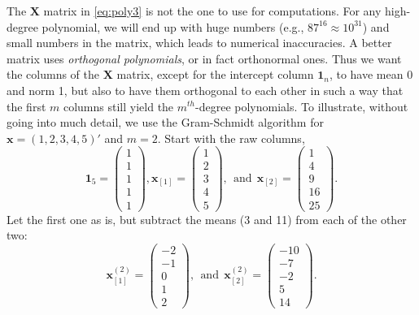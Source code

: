 \documentclass[
]{book}
\begin{document}
The \(\mathbf{X}\) matrix in \eqref{eq:poly3} is not the one to use for computations. For any high-degree polynomial, we will end up with huge numbers (e.g., \(87^{16}\approx 10^{31}\)) and small numbers in the matrix, which leads to numerical inaccuracies. A better matrix uses \emph{orthogonal polynomials}, or in fact orthonormal ones. Thus we want the columns of the \(\mathbf{X}\) matrix, except for the intercept column \(\mathbf{1}_n\), to have mean 0 and norm 1, but also to have them orthogonal to each other in such a way that the first \(m\) columns still yield the \(m^{th}\)-degree polynomials. To illustrate, without going into much detail, we use the Gram-Schmidt algorithm for \(\mathbf{x}=(1,2,3,4,5)'\) and \(m=2\). Start with the raw columns,
\begin{equation}
\mathbf{1}_5=\begin{pmatrix}1\\1\\1\\1\\1\end{pmatrix},
\mathbf{x}_{[1]} = \begin{pmatrix}1\\2\\3\\4\\5\end{pmatrix},~~\text{and}~~
\mathbf{x}_{[2]} = \begin{pmatrix}1\\4\\9\\16\\25\end{pmatrix}.
\label{eq:poly10}
\end{equation}
Let the first one as is, but subtract the means (3 and 11) from each of the other two:
\begin{equation}
{\mathbf{x}}^{(2)}_{[1]} = \begin{pmatrix}-2\\-1\\0\\1\\2\end{pmatrix},~~\text{and}~~
{\mathbf{x}}^{(2)}_{[2]} = \begin{pmatrix}-10\\-7\\-2\\5\\14\end{pmatrix}.
\label{eq:poly11}
\end{equation}
\end{document}
